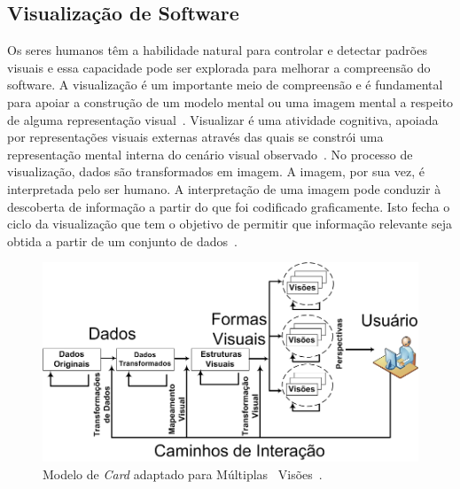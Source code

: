 \documentclass[12pt]{article}
\begin{document}
\subsection{Visualização de Software}

Os seres humanos têm a habilidade natural para controlar e detectar padrões visuais e essa capacidade pode ser explorada para melhorar a compreensão do software. A visualização é um importante meio de compreensão e é fundamental para apoiar a construção de um modelo mental ou uma imagem mental a respeito de alguma representação visual~\cite{spence2014information}. Visualizar é uma atividade cognitiva, apoiada por representações visuais externas através das quais se constrói uma representação mental interna do cenário visual observado~\cite{spence2014information, ware2012information}. No processo de visualização, dados são transformados em imagem. A imagem, por sua vez, é interpretada pelo ser humano. A interpretação de uma imagem pode conduzir à descoberta de informação a partir do que foi codificado graficamente. Isto fecha o ciclo da visualização que tem o objetivo de permitir que informação relevante seja obtida a partir de um conjunto de dados~\cite{source_miner_glauco}. 

\begin{figure}[h]
 \centering
 \includegraphics[scale=0.39]{image.png}
 \caption{Modelo de \textit{Card} adaptado para Múltiplas~ Visões~\cite{source_miner_glauco}.}
 \label{fig:modelo_card}
\end{figure}
\end{document}
